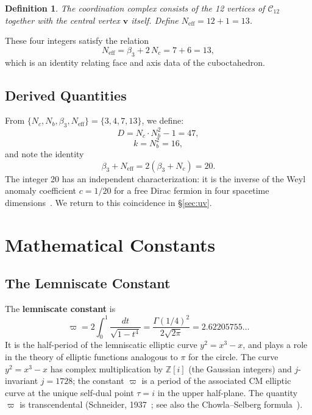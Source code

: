 \documentclass[12pt,a4paper]{article}
\newtheorem{definition}[theorem]{Definition}
\newcommand{\vpi}{\varpi}
\begin{document}
\begin{definition}
The coordination complex consists of the 12 vertices of $\mathcal{C}_{12}$ together with the central vertex $\mathbf{v}$ itself. Define $N_{\mathrm{eff}} = 12 + 1 = 13$.
\end{definition}

\noindent These four integers satisfy the relation
\begin{equation}\label{eq:identity1}
N_{\mathrm{eff}} = \beta_{3} + 2\,N_{c} = 7 + 6 = 13,
\end{equation}
which is an identity relating face and axis data of the cuboctahedron.

\subsection{Derived Quantities}

From $\{N_{c}, N_{b}, \beta_{3}, N_{\mathrm{eff}}\} = \{3, 4, 7, 13\}$, we define:
\begin{equation}\label{eq:D}
D = N_{c} \cdot N_{b}^{2} - 1 = 47,
\end{equation}
\begin{equation}\label{eq:k}
k = N_{b}^{2} = 16,
\end{equation}
and note the identity
\begin{equation}\label{eq:twenty}
\beta_{3} + N_{\mathrm{eff}} = 2(\beta_{3} + N_{c}) = 20.
\end{equation}
The integer 20 has an independent characterization: it is the inverse of the Weyl anomaly coefficient $c = 1/20$ for a free Dirac fermion in four spacetime dimensions~\cite{DeserSchwimmer}. We return to this coincidence in \S\ref{sec:uv}.

\section{Mathematical Constants}

\subsection{The Lemniscate Constant}

The \textbf{lemniscate constant} is
\begin{equation}\label{eq:varpi}
\vpi = 2 \int_{0}^{1} \frac{dt}{\sqrt{1 - t^{4}}} = \frac{\Gamma(1/4)^{2}}{2\sqrt{2\pi}} = 2.62205755\ldots
\end{equation}
It is the half-period of the lemniscatic elliptic curve $y^{2} = x^{3} - x$, and plays a role in the theory of elliptic functions analogous to $\pi$ for the circle. The curve $y^{2} = x^{3} - x$ has complex multiplication by $\mathbb{Z}[i]$ (the Gaussian integers) and $j$-invariant $j = 1728$; the constant $\vpi$ is a period of the associated CM elliptic curve at the unique self-dual point $\tau = i$ in the upper half-plane. The quantity $\vpi$ is transcendental (Schneider, 1937~\cite{Schneider}; see also the Chowla--Selberg formula~\cite{ChowlaSelberg}).
\end{document}
